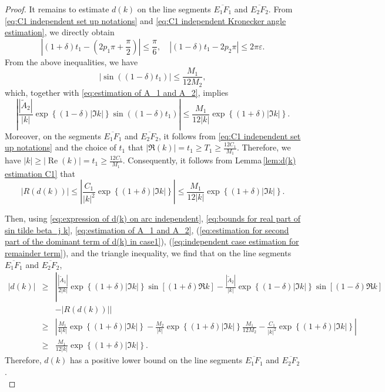 \documentclass[11pt,reqno]{amsart}
\theoremstyle{definition}
\theoremstyle{remark}
\numberwithin{equation}{section}
\begin{document}
\begin{proof}
It remains to estimate $d(k)$ on the line segments $\overline{E_1F_1}$ and $\overline{E_2F_2}$. From \eqref{eq:C1 independent set up notations} and \eqref{eq:C1 independent Kronecker angle estimation}, we directly obtain
\begin{equation*}
|\left(1+\delta\right)t_1 - (2p_1\pi +\frac{\pi}{2})| \leq \frac{\pi}{6}, \quad
|\left(1-\delta\right)t_1-2p_2\pi | \leq  2\pi \varepsilon.
\end{equation*}
From the above inequalities, we have
\begin{equation*}
	\left|\sin(\left(1-\delta\right)t_1)\right|\leq \frac{M_1}{12M_2},
\end{equation*}
which, together with \eqref{eq:estimation of A_1 and A_2}, implies
\begin{equation}\label{eq:estimation for second part of the dominant term of d(k) in case1}
		\left|\frac{|\tilde{A}_2|}{|k|}\exp{\left\{(1-\delta)\left|\Im k\right|\right\}}\sin{((1-\delta)t_1)}\right|\leq \frac{M_1}{12|k|}\exp{\left\{(1+\delta)\left|\Im k\right|\right\}}.
\end{equation}
Moreover, on the segments $\overline{E_1F_1}$ and $\overline{E_2F_2}$, it follows from \eqref{eq:C1 independent set up notations} and the choice of $t_1$ that $|\Re (k)| = t_1 \geq T_1 \geq \frac{12C_1}{M_1}$. Therefore, we have $|k| \geq |\operatorname{Re}(k)| = t_1 \geq \frac{12C_1}{M_1}$. Consequently, it follows from Lemma\,\ref{lem:d(k) estimation C1} that
\begin{equation}\label{eq:independent case estimation for remainder term}
|R(d(k))| \leq	\left|\frac{C_1}{|k|^2}\exp{\left\{(1+\delta)\left|\Im k\right|\right\}}\right|\leq \frac{M_1}{12|k|}\exp{\left\{(1+\delta)\left|\Im k\right|\right\}}.
\end{equation}
		
Then, using \eqref{eq:expression of d(k) on arc independent}, \eqref{eq:bounds for real part of sin tilde beta_j k}, \eqref{eq:estimation of A_1 and A_2}, (\ref{eq:estimation for second part of the dominant term of d(k) in case1}), (\ref{eq:independent case estimation for remainder term}), and the triangle inequality, we find that on the line segments $\overline{E_1F_1}$ and $\overline{E_2F_2}$,
\begin{eqnarray*}
		|d(k)|	&\geq &\left|\frac{|\tilde{A}_1|}{2|k|}\exp{\left\{(1+\delta)\left|\Im k\right|\right\}}\sin{\left[(1+\delta)\Re{k}\right]}-\frac{|\tilde{A}_2|}{|k|}\exp{\left\{(1-\delta)\left|\Im k\right|\right\}}\sin{\left[(1-\delta)\Re{k}\right]}\right. \nonumber \\
		&&-\left.|R(d(k))| \right| \nonumber\\
		&\geq &\left|\frac{M_1}{4|k|}\exp{\left\{(1+\delta)\left|\Im k\right|\right\}}-\frac{M_2}{|k|}\exp{\left\{(1+\delta)\left|\Im k\right|\right\}}\frac{M_1}{12M_2}-\frac{C_1}{|k|^2}\exp{\left\{(1+\delta)\left|\Im k\right|\right\}}\right| \nonumber\\
		&\geq &\frac{M_1}{12|k|}\exp{\left\{(1+\delta)\left|\Im k\right|\right\}}.
\end{eqnarray*}
Therefore, $d(k)$ has a positive lower bound on the line segments $\overline{E_1F_1}$ and $\overline{E_2F_2}$.\\
	

\end{proof}
\end{document}
